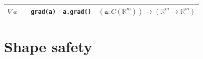 \documentclass[12pt,initial,twoside,maitrise]{dms}
\numberwithin{equation}{section}
\numberwithin{table}{chapter}
\numberwithin{figure}{chapter}
\begin{document}
{\begin{table}
\begin{tabular}{|c|c|c|c|l|}
               $\nabla a$                                      &                                                                                &  \texttt{grad(a)}                                                                       & \texttt{a.grad()}                                                                          & $                   (\texttt{a}: C(\mathbb{R}^{m})) \rightarrow (\mathbb{R}^{m}\rightarrow\mathbb{R}^{m})                                                                         $ \\ \hline
    \end{tabular}
\end{table}
}

\section{Shape safety}\label{sec:shape-safety}
\end{document}
